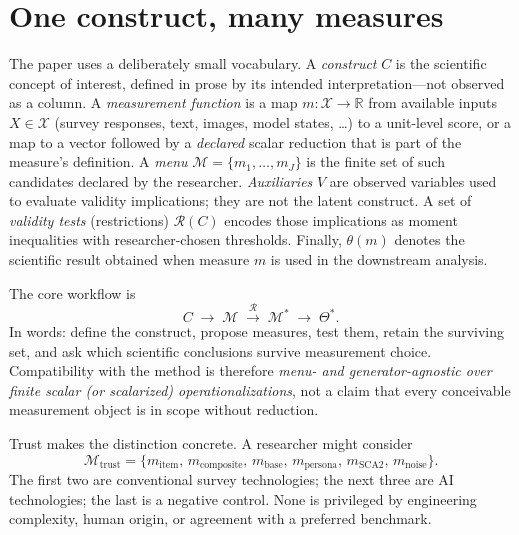 \documentclass[10pt,letterpaper]{article}
\newcommand{\M}{\ensuremath{\mathcal{M}}}
\newcommand{\Rset}{\mathcal{R}}
\begin{document}
\section{One construct, many measures}
The paper uses a deliberately small vocabulary.
A \emph{construct} $C$ is the scientific concept of interest, defined in prose by its intended interpretation---not observed as a column.
A \emph{measurement function} is a map $m:\mathcal{X}\to\mathbb{R}$ from available inputs $X\in\mathcal{X}$ (survey responses, text, images, model states, \ldots) to a unit-level score, or a map to a vector followed by a \emph{declared} scalar reduction that is part of the measure's definition.
A \emph{menu} $\M=\{m_1,\ldots,m_J\}$ is the finite set of such candidates declared by the researcher.
\emph{Auxiliaries} $V$ are observed variables used to evaluate validity implications; they are not the latent construct.
A set of \emph{validity tests} (restrictions) $\Rset(C)$ encodes those implications as moment inequalities with researcher-chosen thresholds.
Finally, $\theta(m)$ denotes the scientific result obtained when measure $m$ is used in the downstream analysis.

The core workflow is
\begin{equation}
C \;\longrightarrow\; \M \;\xrightarrow{\;\Rset\;}\; \M^* \;\longrightarrow\; \Theta^*.
\label{eq:workflow}
\end{equation}
In words: define the construct, propose measures, test them, retain the surviving set, and ask which scientific conclusions survive measurement choice.
Compatibility with the method is therefore \emph{menu- and generator-agnostic over finite scalar (or scalarized) operationalizations}, not a claim that every conceivable measurement object is in scope without reduction.

Trust makes the distinction concrete.
A researcher might consider
\begin{equation}
\M_{\mathrm{trust}}=\bigl\{m_{\mathrm{item}},\, m_{\mathrm{composite}},\, m_{\mathrm{base}},\, m_{\mathrm{persona}},\, m_{\mathrm{SCA2}},\, m_{\mathrm{noise}}\bigr\}.
\label{eq:trustmenu}
\end{equation}
The first two are conventional survey technologies; the next three are AI technologies; the last is a negative control.
None is privileged by engineering complexity, human origin, or agreement with a preferred benchmark.
\end{document}
